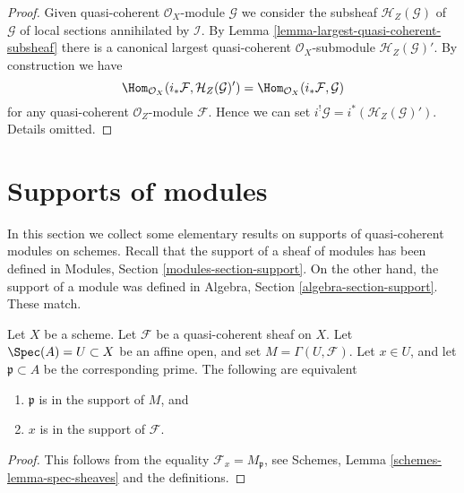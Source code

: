 \begin{proof}
Given quasi-coherent $\mathcal{O}_X$-module $\mathcal{G}$ we consider
the subsheaf $\mathcal{H}_Z(\mathcal{G})$ of $\mathcal{G}$ of local sections
annihilated by $\mathcal{I}$. By
Lemma \ref{lemma-largest-quasi-coherent-subsheaf}
there is a canonical largest quasi-coherent $\mathcal{O}_X$-submodule
$\mathcal{H}_Z(\mathcal{G})'$. By construction we have
$$
\Hom_{\mathcal{O}_X}(i_*\mathcal{F}, \mathcal{H}_Z(\mathcal{G})')
=
\Hom_{\mathcal{O}_X}(i_*\mathcal{F}, \mathcal{G})
$$
for any quasi-coherent $\mathcal{O}_Z$-module $\mathcal{F}$.
Hence we can set $i^!\mathcal{G} = i^*(\mathcal{H}_Z(\mathcal{G})')$.
Details omitted.
\end{proof}











\section{Supports of modules}
\label{section-support}

\noindent
In this section we collect some elementary results on supports of
quasi-coherent modules on schemes.
Recall that the support of a sheaf of modules has been defined in
Modules, Section \ref{modules-section-support}.
On the other hand, the support of a module was defined in
Algebra, Section \ref{algebra-section-support}.
These match.

\begin{lemma}
\label{lemma-support-affine-open}
Let $X$ be a scheme. Let $\mathcal{F}$ be a quasi-coherent sheaf on $X$.
Let $\Spec(A) = U \subset X$ be an affine open, and set
$M = \Gamma(U, \mathcal{F})$.
Let $x \in U$, and let $\mathfrak p \subset A$ be the corresponding prime.
The following are equivalent
\begin{enumerate}
\item $\mathfrak p$ is in the support of $M$, and
\item $x$ is in the support of $\mathcal{F}$.
\end{enumerate}
\end{lemma}

\begin{proof}
This follows from the equality $\mathcal{F}_x = M_{\mathfrak p}$, see
Schemes, Lemma \ref{schemes-lemma-spec-sheaves}
and the definitions.
\end{proof}

